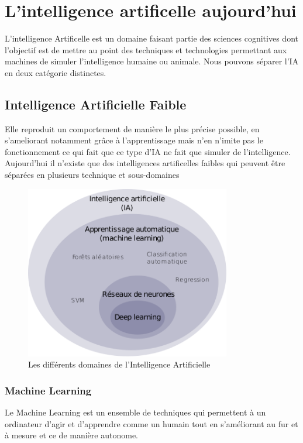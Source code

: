 
\chapter{L'intelligence artificelle aujourd'hui}
L'intelligence Artificelle est un domaine faisant partie 
des sciences cognitives dont l'objectif est de mettre au
point des techniques et technologies permettant aux 
machines de simuler l'intelligence humaine ou animale.
Nous pouvons séparer l'IA en deux catégorie distinctes. 

\section{Intelligence Artificielle Faible}
Elle reproduit un comportement de manière le plus précise possible,
en s'ameliorant notamment grâce à l'apprentissage 
mais n'en n'imite pas le fonctionnement ce qui fait que
ce type d'IA ne fait que simuler de l'intelligence. \newline
Aujourd'hui il n'existe que des intelligences artificelles faibles qui peuvent  
être séparées en plusieurs technique et sous-domaines \newline

\begin{figure}[!h]
    \centering
    \includegraphics[width=0.8\textwidth]{Images/aitype}
    \caption{Les différents domaines de l'Intelligence Artificielle}
	\label{fig:categorieIA}
\end{figure}
\newpage

\subsection{Machine Learning}
Le Machine Learning est un ensemble de techniques qui permettent à un ordinateur 
d'agir et d'apprendre comme un humain tout en s'améliorant au fur et 
à mesure et ce de manière autonome. \newline

